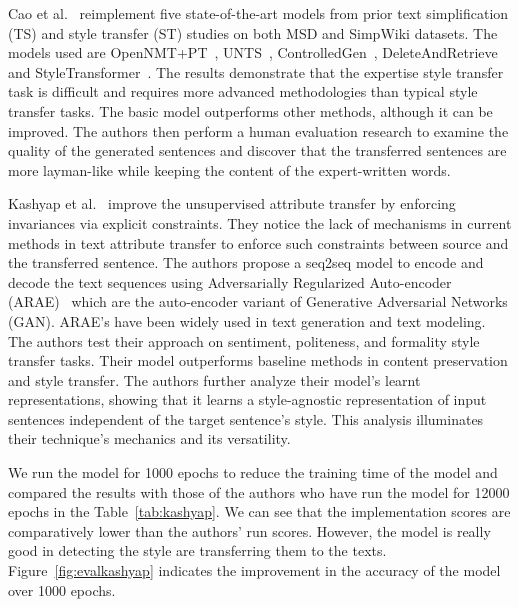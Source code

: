 \documentclass[akbc,twoside,11pt]{article}
\begin{document}
Cao et al.~\cite{cao2020expertise} reimplement five state-of-the-art models from prior text simplification (TS) and style transfer (ST) studies on both MSD and SimpWiki datasets. The models used are OpenNMT+PT~\cite{klein-etal-2017-opennmt}, UNTS~\cite{sheang-saggion-2021-controllable}, ControlledGen~\cite{hu2018controlled}, DeleteAndRetrieve~\cite{li-etal-2018-delete} and StyleTransformer~\cite{dai-etal-2019-style}. The results demonstrate that the expertise style transfer task is difficult and requires more advanced methodologies than typical style transfer tasks. The basic model outperforms other methods, although it can be improved. The authors then perform a human evaluation research to examine the quality of the generated sentences and discover that the transferred sentences are more layman-like while keeping the content of the expert-written words.


Kashyap et al.~\cite{kashyap2022different} improve the unsupervised attribute transfer by enforcing invariances via explicit constraints. They notice the lack of mechanisms in current methods in text attribute transfer to enforce such constraints between source and the transferred sentence. The authors propose a seq2seq model to encode and decode the text sequences using Adversarially Regularized Auto-encoder (ARAE)~\cite{zhao2018adversarially} which are the auto-encoder variant of Generative Adversarial Networks (GAN). ARAE's have been widely used in text generation and text modeling. The authors test their approach on sentiment, politeness, and formality style transfer tasks. Their model outperforms baseline methods in content preservation and style transfer. The authors further analyze their model's learnt representations, showing that it learns a style-agnostic representation of input sentences independent of the target sentence's style. This analysis illuminates their technique's mechanics and its versatility.

We run the model for 1000 epochs to reduce the training time of the model and compared the results with those of the authors who have run the model for 12000 epochs in the Table~\ref{tab:kashyap}. We can see that the implementation scores are comparatively lower than the authors' run scores. However, the model is really good in detecting the style are transferring them to the texts. Figure~\ref{fig:evalkashyap} indicates the improvement in the accuracy of the model over 1000 epochs.
\end{document}

